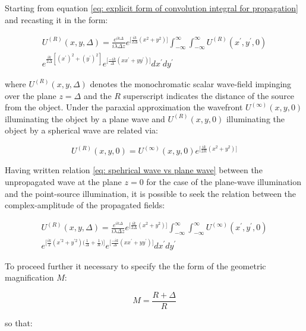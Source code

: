 \documentclass{iucr}              %
\begin{document}
Starting from equation \ref{eq: explicit form of convolution integral for propagation} and recasting it in the form:

\begin{multline}
U^{(R)}(x, y, \Delta)=\frac {e^{ik\Delta}}{ i \lambda \Delta z} e^{\big[\frac{ik}{2\Delta}(x^2+y^2)\big]} \int_{-\infty}^{\infty} \int_{-\infty}^{\infty}U^{(R)}(x^\prime, y^\prime, 0)\\ e^{ \frac{ik}{2 \Delta} [(x^\prime)^2 + (y^\prime)^2]}e^{\big[\frac{-ik}{\Delta}(xx^{\prime}+yy^{\prime})\big]} dx^\prime dy^\prime
\end{multline}

where $U^{(R)}(x, y, \Delta)$ denotes the monochromatic scalar wave-field impinging over the plane $z=\Delta$ and the $R$ superscript indicates the distance of the source from the object. Under the paraxial approximation the wavefront $U^{(\infty)}(x, y, 0)$ illuminating the object by a plane wave and $U^{(R)}(x, y, 0)$ illuminating the object by a spherical wave are related via:

\begin{equation}\label{eq: spehrical wave vs plane wave}
U^{(R)}(x, y, 0)=U^{(\infty)}(x, y, 0)e^{\big[\frac{ik}{2R}(x^2+y^2)\big]}
\end{equation}
 
Having written relation \ref{eq: spehrical wave vs plane wave} between the unpropagated wave at the plane $z=0$ for the case of the plane-wave illumination and the point-source illumination, it is possible to seek the relation between the complex-amplitude of the propagated fields:

\begin{multline}\label{eq: Fresnel rescaling not manipulated}
U^{(R)}(x, y, \Delta)=\frac {e^{ik\Delta}}{ i \lambda \Delta z} e^{\big[\frac{ik}{2\Delta}(x^2+y^2)\big]} \int_{-\infty}^{\infty} \int_{-\infty}^{\infty} U^{(\infty)}(x^\prime, y^\prime, 0)\\
e^{\big[\frac{ik}{2}(x^{\prime 2}+y^{\prime 2})\big(\frac{1}{\Delta}+\frac{1}{R}\big)\big]}e^{\big[\frac{-ik}{\Delta}(xx^{\prime}+yy^{\prime})\big]} dx^\prime dy^\prime
\end{multline}

To proceed further it necessary to specify the the form of the geometric magnification $M$:

\begin{equation}
	M= \frac{R+\Delta}{R}
\end{equation} 

so that:
\end{document}
